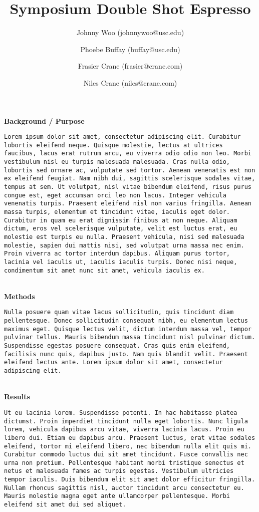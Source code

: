 \documentclass[11pt]{article}
\title{\vspace{-1cm}Symposium Double Shot Espresso
}
\author[]{Johnny Woo (johnnywoo@usc.edu)}\author[]{Phoebe Buffay (buffay@usc.edu)}\author[]{Frasier Crane (frasier@crane.com)}\author[]{Niles Crane (niles@crane.com)}
\affil[]{}
\date{}
\begin{document}
\maketitle
\thispagestyle{fancyfirst}
{\bfseries\large Background / Purpose}
\begin{lstlisting}[mathescape]
Lorem ipsum dolor sit amet, consectetur adipiscing elit. Curabitur lobortis eleifend neque. Quisque molestie, lectus at ultrices faucibus, lacus erat rutrum arcu, eu viverra odio odio non leo. Morbi vestibulum nisl eu turpis malesuada malesuada. Cras nulla odio, lobortis sed ornare ac, vulputate sed tortor. Aenean venenatis est non ex eleifend feugiat. Nam nibh dui, sagittis scelerisque sodales vitae, tempus at sem. Ut volutpat, nisl vitae bibendum eleifend, risus purus congue est, eget accumsan orci leo non lacus. Integer vehicula venenatis turpis. Praesent eleifend nisl non varius fringilla. Aenean massa turpis, elementum et tincidunt vitae, iaculis eget dolor. Curabitur in quam eu erat dignissim finibus at non neque. Aliquam dictum, eros vel scelerisque vulputate, velit est luctus erat, eu molestie est turpis eu nulla. Praesent vehicula, nisi sed malesuada molestie, sapien dui mattis nisi, sed volutpat urna massa nec enim. Proin viverra ac tortor interdum dapibus. Aliquam purus tortor, lacinia vel iaculis ut, iaculis iaculis turpis. Donec nisi neque, condimentum sit amet nunc sit amet, vehicula iaculis ex.
\end{lstlisting}
\hfill \\
{\bfseries\large Methods}
\begin{lstlisting}[mathescape]
Nulla posuere quam vitae lacus sollicitudin, quis tincidunt diam pellentesque. Donec sollicitudin consequat nibh, eu elementum lectus maximus eget. Quisque lectus velit, dictum interdum massa vel, tempor pulvinar tellus. Mauris bibendum massa tincidunt nisl pulvinar dictum. Suspendisse egestas posuere consequat. Cras quis enim eleifend, facilisis nunc quis, dapibus justo. Nam quis blandit velit. Praesent eleifend lectus ante. Lorem ipsum dolor sit amet, consectetur adipiscing elit.
\end{lstlisting}
\hfill \\
{\bfseries\large Results}
\begin{lstlisting}[mathescape]
Ut eu lacinia lorem. Suspendisse potenti. In hac habitasse platea dictumst. Proin imperdiet tincidunt nulla eget lobortis. Nunc ligula lorem, vehicula dapibus arcu vitae, viverra lacinia lacus. Proin eu libero dui. Etiam eu dapibus arcu. Praesent luctus, erat vitae sodales eleifend, tortor mi eleifend libero, nec bibendum nulla elit quis mi. Curabitur commodo luctus dui sit amet tincidunt. Fusce convallis nec urna non pretium. Pellentesque habitant morbi tristique senectus et netus et malesuada fames ac turpis egestas. Vestibulum ultricies tempor iaculis. Duis bibendum elit sit amet dolor efficitur fringilla. Nullam rhoncus sagittis nisl, auctor tincidunt arcu consectetur eu. Mauris molestie magna eget ante ullamcorper pellentesque. Morbi eleifend sit amet dui sed aliquet.
\end{lstlisting}
\end{document}

